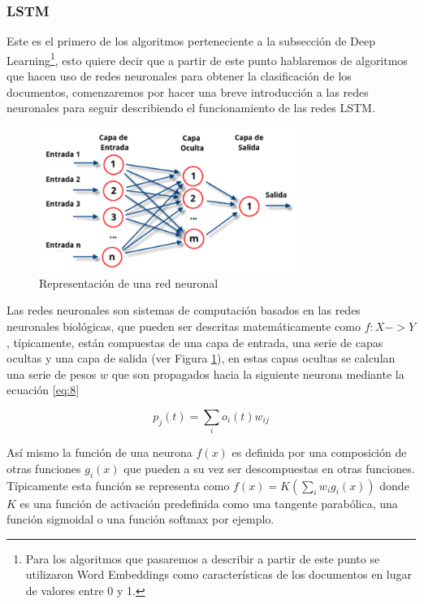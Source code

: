 \subsubsection{LSTM}\label{lstmsection}

Este es el primero de los algoritmos perteneciente a la subsección de Deep Learning\footnote{Para los algoritmos que pasaremos a describir a partir de este punto se utilizaron Word Embeddings como características de los documentos en lugar de valores entre 0 y 1.}, esto quiere decir que a partir de este punto hablaremos de algoritmos que hacen uso de redes neuronales para obtener la clasificación de los documentos, comenzaremos por hacer una breve introducción a las redes neuronales para seguir describiendo el funcionamiento de las redes LSTM.

\begin{figure}[!ht]
	\centering
	\includegraphics[width=0.75\textwidth]{imaxes/red.png}
	\caption{Representación de una red neuronal}
	\label{redneuronal}
\end{figure}

Las redes neuronales son sistemas de computación basados en las redes neuronales biológicas, que pueden ser descritas matemáticamente como \(f: X -> Y\), típicamente, están compuestas de una capa de entrada, una serie de capas ocultas y una capa de salida (ver Figura \ref{redneuronal}), en estas capas ocultas se calculan una serie de pesos \(w\) que son propagados hacia la siguiente neurona mediante la ecuación \ref{eq:8}

\begin{equation} \label{eq:8}
\mathit{p_j(t) = \sum_io_i(t)w_{ij}}
\end{equation}

Así mismo la función de una neurona \(f(x)\) es definida por una composición de otras funciones \(g_i(x)\) que pueden a su vez ser descompuestas en otras funciones. Típicamente esta función se representa como \(f(x) = K(\sum_iw_ig_i(x))\) donde \(K\) es una función de activación predefinida como una tangente parabólica, una función sigmoidal o una función softmax por ejemplo. 

